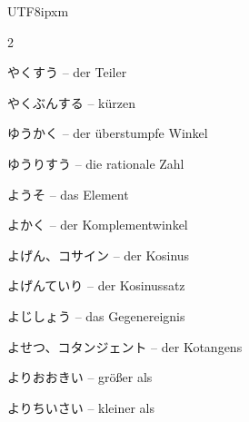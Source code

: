 \begin{CJK}{UTF8}{ipxm}
\begin{multicols}{2}
\par\nopagebreak
{} {\footnotesize\color{black!70}やくすう} -- der Teiler\dotfill\hyperref[e:54]{\pageref*{e:54}}\par
{} {\footnotesize\color{black!70}やくぶんする} -- kürzen\dotfill\hyperref[e:37]{\pageref*{e:37}}\par
{} {\footnotesize\color{black!70}ゆうかく} -- der überstumpfe Winkel\dotfill\hyperref[e:161]{\pageref*{e:161}}\par
{} {\footnotesize\color{black!70}ゆうりすう} -- die rationale Zahl\dotfill\hyperref[e:7]{\pageref*{e:7}}\par
{} {\footnotesize\color{black!70}ようそ} -- das Element\dotfill\hyperref[e:97]{\pageref*{e:97}}\par
{} {\footnotesize\color{black!70}よかく} -- der Komplementwinkel\dotfill\hyperref[e:164]{\pageref*{e:164}}\par
{} {\footnotesize\color{black!70}よげん、コサイン} -- der Kosinus\dotfill\hyperref[e:133]{\pageref*{e:133}}\par
{} {\footnotesize\color{black!70}よげんていり} -- der Kosinussatz\dotfill\hyperref[e:141]{\pageref*{e:141}}\par
{} {\footnotesize\color{black!70}よじしょう} -- das Gegenereignis\dotfill\hyperref[e:329]{\pageref*{e:329}}\par
{} {\footnotesize\color{black!70}よせつ、コタンジェント} -- der Kotangens\dotfill\hyperref[e:135]{\pageref*{e:135}}\par
{} {\footnotesize\color{black!70}よりおおきい} -- größer als\dotfill\hyperref[e:64]{\pageref*{e:64}}\par
{} {\footnotesize\color{black!70}よりちいさい} -- kleiner als\dotfill\hyperref[e:63]{\pageref*{e:63}}\par


\end{multicols}
\end{CJK}
